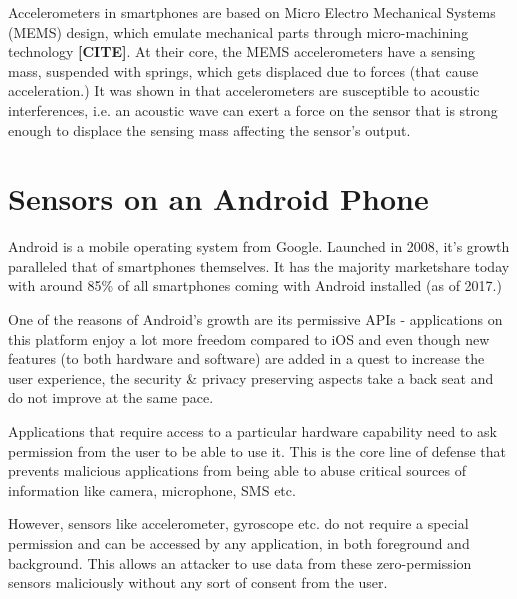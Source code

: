 Accelerometers in smartphones are based on Micro Electro Mechanical Systems (MEMS) design, which emulate mechanical parts through micro-machining technology \textbf{[CITE]}. At their core, the MEMS accelerometers have a sensing mass, suspended with springs, which gets displaced due to forces (that cause acceleration.) It was shown in \cite{walnut} that accelerometers are susceptible to acoustic interferences, i.e. an acoustic wave can exert a force on the sensor that is strong enough to displace the sensing mass affecting the sensor's output.

\section{Sensors on an Android Phone}
\label{ch1-intro-android}

Android is a mobile operating system from Google. Launched in 2008, it's growth paralleled that of smartphones themselves. It has the majority marketshare today with around 85\% of all smartphones coming with Android installed (as of 2017.) \cite{androidshare}

One of the reasons of Android's growth are its permissive APIs - applications on this platform enjoy a lot more freedom compared to iOS and even though new features (to both hardware and software) are added in a quest to increase the user experience, the security \& privacy preserving aspects take a back seat and do not improve at the same pace.

Applications that require access to a particular hardware capability need to ask permission from the user to be able to use it. This is the core line of defense that prevents malicious applications from being able to abuse critical sources of information like camera, microphone, SMS etc.

However, sensors like accelerometer, gyroscope etc. do not require a special permission and can be accessed by any application, in both foreground and background. This allows an attacker to use data from these zero-permission sensors maliciously without any sort of consent from the user.




